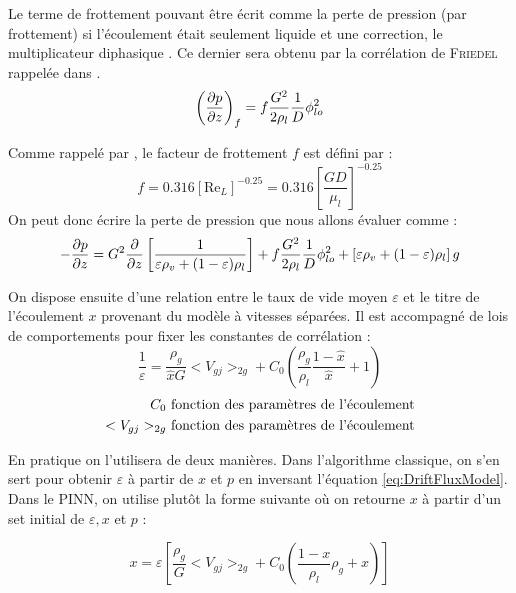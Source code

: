 Le terme de frottement pouvant être écrit comme la perte de pression (par frottement) si l'écoulement était seulement liquide et une correction, le \og multiplicateur diphasique \fg{}. Ce dernier sera obtenu par la corrélation de \textsc{Friedel} rappelée dans \cite{revellinAdiabaticTwophaseFrictional2007}.
\begin{equation}
    \left(\pder[p]{z} \right)_{f} = f\frac{G^2}{2 \rho_l}\frac{1}{D} \phi_{lo}^2
\end{equation}

Comme rappelé par \cite{revellinAdiabaticTwophaseFrictional2007}, le facteur de frottement $f$ est défini par :
\begin{equation}
    f = 0.316 \left[\text{Re}_L\right]^{-0.25} = 0.316 \left[\frac{G D}{\mu_l}\right]^{-0.25} 
\end{equation}
On peut donc écrire la perte de pression que nous allons évaluer comme :
\begin{equation}
     -\pder[p]{z} = G^2\pder{z}\left[\frac{1}{\varepsilon \rho_v + (1-\varepsilon)\rho_l } \right] + f\frac{G^2}{2 \rho_l}\frac{1}{D} \phi_{lo}^2 + \left[ \varepsilon \rho_v + (1-\varepsilon)\rho_l  \right] g
\end{equation}


On dispose ensuite d'une relation entre le taux de vide moyen $\varepsilon$ et le titre de l'écoulement $x$ provenant du modèle à vitesses séparées. Il est accompagné de lois de comportements pour fixer les constantes de corrélation :
\begin{equation}
        \frac{1}{\varepsilon} = \frac{\rho_g}{\hat{x} G} <V_{gj}>_{2g} + C_0\left(\frac{\rho_g}{\rho_l}\frac{1-\hat{x}}{\hat{x}} + 1\right) 
\label{eq:DriftFluxModel}
\end{equation}
\begin{align*}
         C_0 &\textnormal{ fonction des paramètres de l'écoulement}\\
        <V_{gj}>_{2g} &\textnormal{ fonction des paramètres de l'écoulement}   
\end{align*}

En pratique on l'utilisera de deux manières. Dans l'algorithme classique, on s'en sert pour obtenir $\varepsilon$ à partir de $x$ et $p$ en inversant l'équation \ref{eq:DriftFluxModel}. Dans le PINN, on utilise plutôt la forme suivante où on retourne $x$ à partir d'un set initial de $\varepsilon,x$ et $p$ :

\begin{equation}
    x = \varepsilon \left[ \frac{\rho_g}{G}<V_{gj}>_{2g} + C_0 \left( \frac{1-x}{\rho_l}\rho_g + x\right) \right]
\end{equation}

